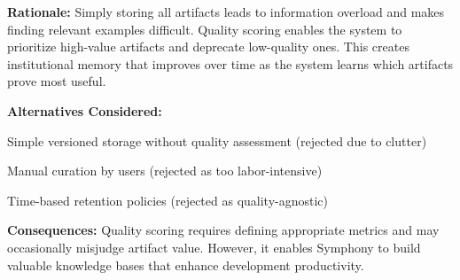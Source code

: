 \textbf{Rationale:} Simply storing all artifacts leads to information overload and makes finding relevant examples difficult. Quality scoring enables the system to prioritize high-value artifacts and deprecate low-quality ones. This creates institutional memory that improves over time as the system learns which artifacts prove most useful.

\textbf{Alternatives Considered:}
\begin{compactlist}
    \item Simple versioned storage without quality assessment (rejected due to clutter)
    \item Manual curation by users (rejected as too labor-intensive)
    \item Time-based retention policies (rejected as quality-agnostic)
\end{compactlist}

\textbf{Consequences:} Quality scoring requires defining appropriate metrics and may occasionally misjudge artifact value. However, it enables Symphony to build valuable knowledge bases that enhance development productivity.
